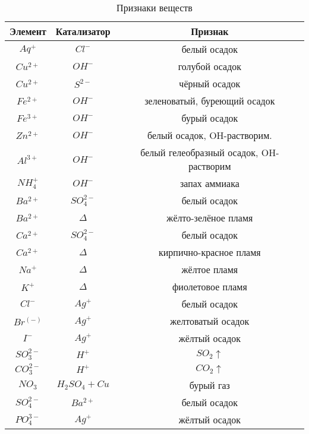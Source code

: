 \documentclass[a4paper, 12pt]{article}
\begin{document}
        \begin{table}[!ht]
        	\centering
            \caption{Признаки веществ}
            \begin{tabular}{| c | c | c |} \hline
                \textbf{Элемент} &  \textbf{Катализатор} & \textbf{Признак} \\\hline
                $Aq^{+}$ & $Cl^{-}$ & белый осадок \\\hline
                $Cu^{2+}$ & $OH^{-}$ & голубой осадок \\\hline
                $Cu^{2+}$ & $S^{2-}$ & чёрный осадок \\\hline
                $Fe^{2+}$ & $OH^{-}$ & зеленоватый, буреющий осадок \\\hline
                $Fe^{3+}$ & $OH^{-}$ & бурый осадок \\\hline
                $Zn^{2+}$ & $OH^{-}$ & белый осадок, OH-растворим. \\\hline
                $Al^{3+}$ & $OH^{-}$ & белый гелеобразный осадок, OH-растворим \\\hline
                $NH_{4}^{+}$ & $OH^{-}$ & запах аммиака \\\hline
                $Ba^{2+}$ & $SO_{4}^{2-}$ & белый осадок \\\hline
                $Ba^{2+}$ & $\Delta$ & жёлто-зелёное пламя \\\hline
                $Ca^{2+}$ & $SO_{4}^{2-}$ & белый осадок \\\hline
                $Ca^{2+}$ & $\Delta$ &кирпично-красное пламя \\\hline
                $Na^{+}$ & $\Delta$ & жёлтое пламя \\\hline
                $K^{+}$ & $\Delta$ & фиолетовое пламя \\\hline
                $Cl^{-}$ & $Ag^{+}$ & белый осадок \\\hline
                $Br^(-)$ & $Ag^{+}$ & желтоватый осадок\\\hline
                $I^{-}$ & $Ag^{+}$ & жёлтый осадок\\\hline
                $SO_{3}^{2-}$ & $H^{+}$ & $SO_{2} \uparrow$ \\\hline
                $CO_{3}^{2-}$ & $H^{+}$ & $CO_{2} \uparrow$ \\\hline
                $NO_{3}$ & $H_{2}SO_{4} + Cu$ & бурый газ\\\hline
                $SO_{4}^{2-}$ & $Ba^{2+}$ & белый осадок\\\hline
                $PO_{4}^{3-}$ & $Ag^{+}$ & жёлтый осадок\\\hline
            \end{tabular} 
        \end{table}
\end{document}
